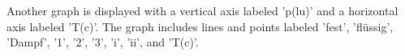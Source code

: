 Another graph is displayed with a vertical axis labeled 'p(lu)' and a horizontal axis labeled 'T(c)'. The graph includes lines and points labeled 'fest', 'flüssig', 'Dampf', '1', '2', '3', 'i', 'ii', and 'T(c)'.